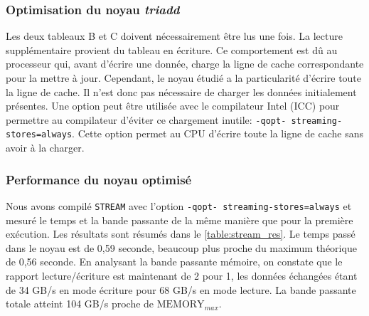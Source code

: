         
        \subsubsection{Optimisation du noyau \textit{triadd}}
            
            Les deux tableaux B et C doivent nécessairement être lus une fois. La lecture supplémentaire provient du tableau en écriture. Ce comportement est dû au processeur qui, avant d'écrire une donnée, charge la ligne de cache correspondante pour la mettre à jour. Cependant, le noyau étudié a la particularité d'écrire toute la ligne de cache. Il n'est donc pas nécessaire de charger les données initialement présentes. Une option peut être utilisée avec le compilateur Intel (ICC) pour permettre au compilateur d'éviter ce chargement inutile: \verb|-qopt- streaming-stores=always|. Cette option permet au CPU d'écrire toute la ligne de cache sans avoir à la charger.
            
        
        \subsubsection{Performance du noyau optimisé}
        
            Nous avons compilé \verb|STREAM| avec l'option \verb|-qopt- streaming-stores=always| et mesuré le temps et la bande passante de la même manière que pour la première exécution. Les résultats sont résumés dans le \autoref{table:stream_res}. Le temps passé dans le noyau est de 0,59 seconde, beaucoup plus proche du maximum théorique de 0,56 seconde. En analysant la bande passante mémoire, on constate que le rapport lecture/écriture est maintenant de 2 pour 1, les données échangées étant de 34 GB/s en mode écriture pour 68 GB/s en mode lecture. La bande passante totale atteint 104 GB/s proche de $\text{MEMORY}_{max}$.
            
            

